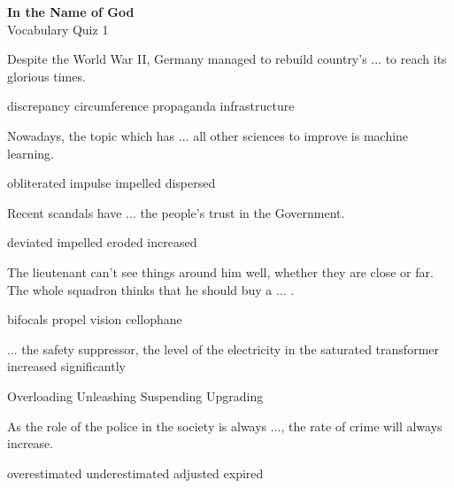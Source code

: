 \documentclass{exam}
\begin{document}
\begin{center}
\textbf{In the Name of God}\\ 
Vocabulary Quiz 1
\end{center}
\vspace{5mm}
\begin{questions}


\question Despite the World War II, Germany managed to rebuild country's ... to reach its glorious times.\\
\begin{oneparchoices}
 \choice discrepancy
 \choice circumference
 \choice propaganda
 \correctchoice infrastructure
\end{oneparchoices}



\question Nowadays, the topic which has ... all other sciences to improve is machine learning.\\
\begin{oneparchoices}
 
 \choice obliterated
 \choice impulse
\correctchoice impelled
 \choice dispersed
\end{oneparchoices}


\question Recent scandals have ... the people's trust in the Government.\\
\begin{oneparchoices}
 \choice deviated
 \choice impelled
 \correctchoice  eroded
 \choice increased
\end{oneparchoices}


\question The lieutenant can't see things around him well, whether they are close or far. The whole squadron thinks that he should buy a ... .\\
\begin{oneparchoices}
 \correctchoice bifocals
 \choice propel
 \choice vision
 \choice cellophane
\end{oneparchoices}



\question ... the safety suppressor, the level of the electricity in the saturated transformer increased significantly\\
\begin{oneparchoices}
\choice Overloading
 \correctchoice Unleashing
 \choice Suspending
 \choice Upgrading
\end{oneparchoices}


\question As the role of the police in the society is always ..., the rate of crime will always increase.\\
\begin{oneparchoices}
\choice overestimated
 \correctchoice underestimated
 \choice adjusted
 \choice expired 
\end{oneparchoices}



\end{questions}
\end{document}
